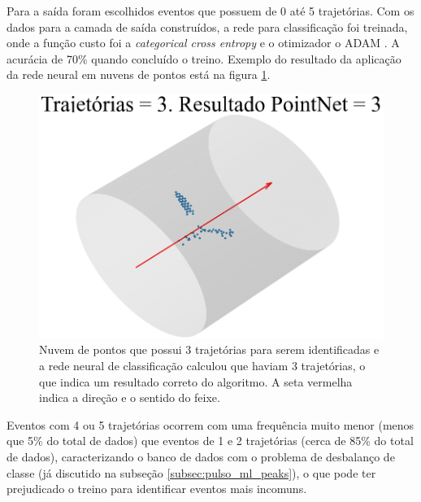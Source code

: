 \documentclass[a4paper,12pt,oneside]{book}
\begin{document}
\par Para a saída foram escolhidos eventos que possuem de 0 até 5 trajetórias. Com os dados para a camada de saída construídos, a rede para classificação foi treinada, onde a função custo foi a \textit{categorical cross entropy} \cite{MSE_CEF_review} e o otimizador o ADAM \cite{ADAMAX}. A acurácia de 70\% quando concluído o treino. Exemplo do resultado da aplicação da rede neural em nuvens de pontos está na figura \ref{fig:pointnet_class_exs}.

\begin{figure}[H]
    \centering
    \includegraphics[scale = 0.5]{figs/ex1_pointnet_class.png}
    \caption{Nuvem de pontos que possui 3 trajetórias para serem identificadas e a rede neural de classificação calculou que haviam 3 trajetórias, o que indica um resultado correto do algoritmo. A seta vermelha indica a direção e o sentido do feixe.}
    \label{fig:pointnet_class_exs}
\end{figure}

\par Eventos com 4 ou 5 trajetórias ocorrem com uma frequência muito menor (menos que 5\% do total de dados) que eventos de 1 e 2 trajetórias (cerca de 85\% do total de dados), caracterizando o banco de dados com o problema de desbalanço de classe (já discutido na subseção \ref{subsec:pulso_ml_peaks}), o que pode ter prejudicado o treino para identificar eventos mais incomuns. 

\end{document}
